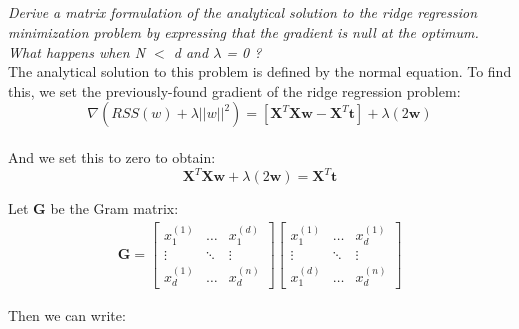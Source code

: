 \documentclass[reqno]{amsart}
\theoremstyle{definition}
\theoremstyle{remark}
\numberwithin{equation}{section}
\begin{document}
\subsection{}
\textit{Derive a matrix formulation of the analytical solution to the ridge
regression minimization problem by expressing that the gradient is
null at the optimum. What happens when N $<$ d and $\lambda$ = 0 ?} \\

The analytical solution to this problem is defined by the normal equation. To find this, we set the previously-found gradient of the ridge regression problem: \\

\begin{equation}
    \nabla(RSS(w) + \lambda ||w||^2) =  
        [\mathbf{X}^T\mathbf{Xw}-\mathbf{X}^T\mathbf{t}] + 
        \lambda (2 \mathbf{w})
\end{equation} \\

And we set this to zero to obtain: \\

\begin{equation}
     \mathbf{X}^T\mathbf{Xw} + \lambda(2 \mathbf{w})= \mathbf{X}^T\mathbf{t}
\end{equation}

Let $\mathbf{G}$ be the Gram matrix: \\

\begin{align*}
\mathbf{G} = \begin{bmatrix} x_1^{(1)} & \dots & x_1^{(d)} \\ \vdots & \ddots & \vdots \\ x_d^{(1)} & \dots & x_d^{(n)} \end{bmatrix} %
    \begin{bmatrix} x_1^{(1)} & \dots & x_d^{(1)} \\ \vdots & \ddots & \vdots \\ x_1^{(d)} & \dots & x_d^{(n)} \end{bmatrix} %
\end{align*}

Then we can write: \\
\end{document}
